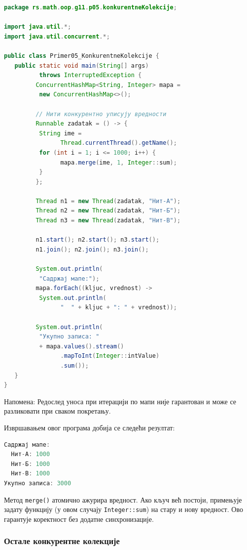 \begin{lstlisting}[language=Java]
package rs.math.oop.g11.p05.konkurentneKolekcije;
 
import java.util.*;
import java.util.concurrent.*;
 
public class Primer05_KonkurentneKolekcije {
   public static void main(String[] args)
          throws InterruptedException {
         ConcurrentHashMap<String, Integer> mapa =
          new ConcurrentHashMap<>();
 
         // Нити конкурентно уписују вредности
         Runnable zadatak = () -> {
          String ime =
                Thread.currentThread().getName();
          for (int i = 1; i <= 1000; i++) {
                mapa.merge(ime, 1, Integer::sum);
          }
         };
 
         Thread n1 = new Thread(zadatak, "Нит-А");
         Thread n2 = new Thread(zadatak, "Нит-Б");
         Thread n3 = new Thread(zadatak, "Нит-В");
 
         n1.start(); n2.start(); n3.start();
         n1.join(); n2.join(); n3.join();
 
         System.out.println(
          "Садржај мапе:");
         mapa.forEach((kljuc, vrednost) ->
          System.out.println(
                "  " + kljuc + ": " + vrednost));
 
         System.out.println(
          "Укупно записа: "
          + mapa.values().stream()
                .mapToInt(Integer::intValue)
                .sum());
   }
}
\end{lstlisting}


Напомена: Редослед уноса при итерацији по мапи није гарантован и може се разликовати при сваком покретању.

Извршавањем овог програма добија се следећи резултат:


\begin{lstlisting}[language=Java]
Садржај мапе:
  Нит-А: 1000
  Нит-Б: 1000
  Нит-В: 1000
Укупно записа: 3000
\end{lstlisting}


Метод \texttt{merge()} атомично ажурира вредност. Ако кључ већ постоји, примењује задату функцију (у овом случају \texttt{Integer::sum}) на стару и нову вредност. Ово гарантује коректност без додатне синхронизације.


\subsubsection{Остале конкурентне колекције}

